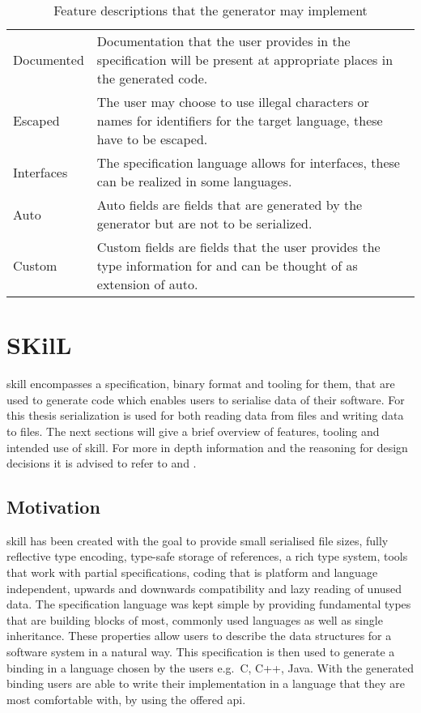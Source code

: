 \documentclass[thesis]{subfiles}
\begin{document}
  \begin{table}
    \begin{tabu}to\linewidth{lX}
      Documented
       & Documentation that the user provides in the specification will be present at appropriate places in the generated code.\autocite{skill-tr}    \\
      Escaped
       & The user may choose to use illegal characters or names for identifiers for the target language, these have to be escaped.\autocite{skill-tr} \\
      Interfaces
       & The specification language allows for interfaces, these can be realized in some languages.\autocite{skill-tr}                                \\
      Auto
       & Auto fields are fields that are generated by the generator but are not to be serialized.\autocite{skill-tr}                                  \\
      Custom
       & Custom fields are fields that the user provides the type information for and can be thought of as extension of auto.\autocite{skill-tr}      \\
    \end{tabu}
    \caption{Feature descriptions that the generator may implement}\label{tab:feat}
  \end{table}

\section{SKilL}\label{sec:skill}
  \gls{skill} encompasses a specification, binary format and tooling for them, that are used to generate code which enables users to serialise data of their software.
  For this thesis serialization is used for both reading data from files and writing data to files.
  The next sections will give a brief overview of features, tooling and intended use of \gls{skill}.
  For more in depth information and the reasoning for design decisions it is advised to refer to \autocite{skill-tr} and \autocite{skill-dis}.

  \subsection{Motivation}
    \gls{skill} has been created with the goal to provide small serialised file sizes, fully reflective type encoding, type-safe storage of references, a rich type system, tools that work with partial specifications,
    coding that is platform and language independent, upwards and downwards compatibility and lazy reading of unused data.
    The specification language was kept simple by providing fundamental types that are building blocks of most, commonly used languages as well as single inheritance.
    These properties allow users to describe the data structures for a software system in a natural way.
    This specification is then used to generate a binding in a language chosen by the users e.g.~C, C++, Java.
    With the generated binding users are able to write their implementation in a language that they are most comfortable with, by using the offered \gls{api}.
    \autocite{skill-tr}
\end{document}
